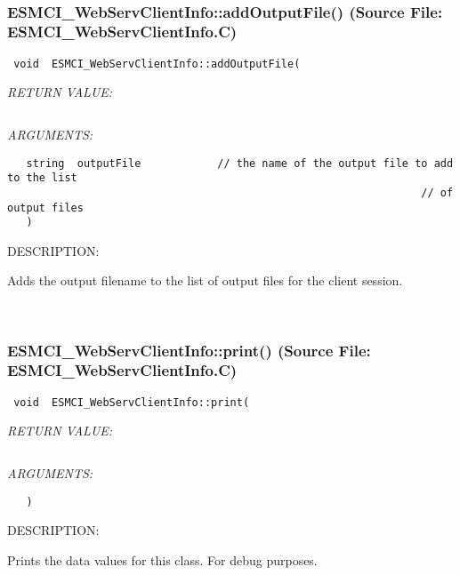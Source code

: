  
\mbox{}\hrulefill\
 
\subsubsection{ESMCI\_WebServClientInfo::addOutputFile() (Source File: ESMCI\_WebServClientInfo.C)}


  
\begin{verbatim} void  ESMCI_WebServClientInfo::addOutputFile(\end{verbatim}{\em RETURN VALUE:}
\begin{verbatim} \end{verbatim}{\em ARGUMENTS:}
\begin{verbatim}   string  outputFile            // the name of the output file to add to the list
                                                                 // of output files
   )\end{verbatim}
{\sf DESCRIPTION:\\ }


      Adds the output filename to the list of output files for the client
      session.
   
 
\mbox{}\hrulefill\
 
\subsubsection{ESMCI\_WebServClientInfo::print() (Source File: ESMCI\_WebServClientInfo.C)}


  
\begin{verbatim} void  ESMCI_WebServClientInfo::print(\end{verbatim}{\em RETURN VALUE:}
\begin{verbatim} \end{verbatim}{\em ARGUMENTS:}
\begin{verbatim}   )\end{verbatim}
{\sf DESCRIPTION:\\ }


      Prints the data values for this class.  For debug purposes.
  
\setlength{\parskip}{\oldparskip}
\setlength{\parindent}{\oldparindent}
\setlength{\baselineskip}{\oldbaselineskip}
